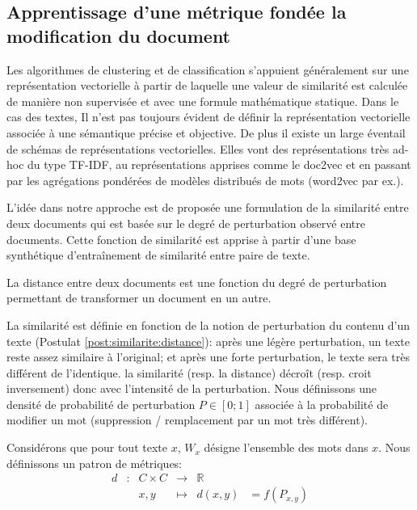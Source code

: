 \subsection{Apprentissage d'une métrique fondée la modification du document}
Les algorithmes de clustering et de classification s'appuient généralement sur une représentation vectorielle à partir de laquelle une valeur de similarité est calculée de manière non supervisée et avec une formule mathématique statique. Dans le cas des textes, Il n'est pas toujours évident de définir la représentation vectorielle associée à une sémantique précise et objective. De plus il existe un large éventail de schémas de représentations vectorielles. Elles vont des représentations très ad-hoc du type TF-IDF, au représentations apprises comme le doc2vec et en passant par les agrégations pondérées de modèles distribués de mots (word2vec par ex.). 

L'idée dans notre approche est de proposée une formulation de la similarité entre deux documents qui est basée sur le degré de perturbation observé entre documents. Cette fonction de similarité est apprise à partir d'une base synthétique d'entraînement de similarité entre paire de texte. 
\begin{postulat}
La distance entre deux documents est une fonction du degré de perturbation permettant de transformer un document en un autre. \label{post:similarite:distance}
\end{postulat}
La similarité est définie en fonction de la notion de perturbation du contenu d'un texte (Postulat \ref{post:similarite:distance}): après une légère perturbation, un texte reste assez similaire à l'original; et après une forte perturbation, le texte sera très différent de l'identique. la similarité (resp. la distance) décroît (resp. croit inversement) donc avec l'intensité de la perturbation. Nous définissons une densité de probabilité de perturbation $P \in [0; 1]$ associée à la probabilité de modifier un mot (suppression / remplacement par un mot très différent). 

Considérons que pour tout texte $x$, $W_x$ désigne l'ensemble des mots dans $x$.
Nous définissons un patron de métriques:
\begin{equation}
\begin{array}{cccccc}
d & : & C \times C & \to & \mathbb{R} & \\
 & & x, y & \mapsto & d(x, y) & = f(P_{x,y}) \\
\end{array}
\end{equation}

